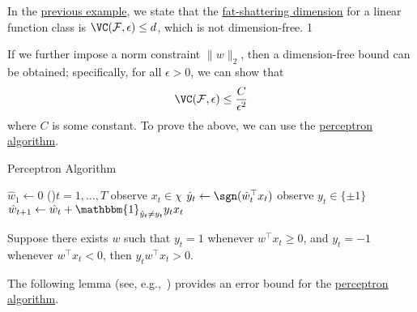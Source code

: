 \begin{prev}
	In the \hyperref[eg:lec16]{previous example}, we state that the \hyperref[def:fat-shattering-dimension]{fat-shattering dimension} for a linear function class is \(\VC(\mathcal{F}, \epsilon) \leq d\), which is not dimension-free.	1
\end{prev}

If we further impose a norm constraint \(\lVert w \rVert _2\), then a dimension-free bound can be obtained; specifically, for all \(\epsilon > 0\), we can show that
\[
	\VC(\mathcal{F}, \epsilon) \leq \frac{C}{\epsilon^2}
\]
where \(C\) is some constant. To prove the above, we can use the \hyperref[algo:perceptron]{perceptron algorithm}.

\begin{algorithm}[H]\label{algo:perceptron}
	\DontPrintSemicolon{}
	\caption{Perceptron Algorithm}
	\BlankLine

	\(\hat{w} _1\gets 0\)\;
	\For(){\(t = 1, \dots  , T\)}{
	observe \(x_t \in \chi \)
	\(\hat{y} _t \gets \sgn(\hat{w} _t ^{\top} x_t)\)
	observe \(y_t \in \{ \pm 1 \} \)
	\(\hat{w} _{t+1} \gets \hat{w} _t + \mathbbm{1}_{\hat{y} _t \neq y_t} y_t x_t\)\;
	}
	\;
\end{algorithm}

\begin{remark}
	Suppose there exists \(w\) such that \(y_t = 1\) whenever \(w^{\top} x_t \geq 0\), and \(y_t = -1\) whenever \(w^{\top} x_t < 0\), then \(y_t w^{\top} x_t > 0\).
\end{remark}

The following lemma (see, e.g.,~\cite{novikoff1962convergence}) provides an error bound for the \hyperref[algo:perceptron]{perceptron algorithm}.

